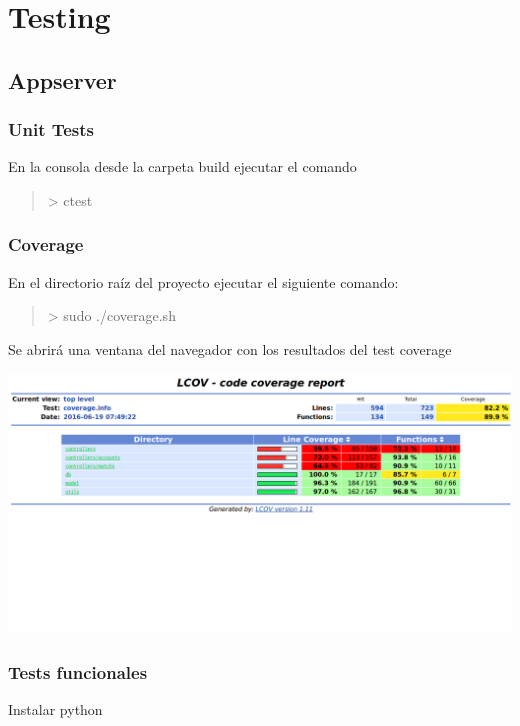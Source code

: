 \documentclass[letterpaper,10pt,english]{sphinxmanual}
\begin{document}
\section{Testing}
\label{manuals:testing}

\subsection{Appserver}
\label{manuals:id2}

\subsubsection{Unit Tests}
\label{manuals:unit-tests}
En la consola desde la carpeta build ejecutar el comando
\begin{quote}

\textgreater{} ctest
\end{quote}


\subsubsection{Coverage}
\label{manuals:coverage}
En el directorio raíz del proyecto ejecutar el siguiente comando:
\begin{quote}

\textgreater{} sudo ./coverage.sh
\end{quote}

Se abrirá una ventana del navegador con los resultados del test coverage

\includegraphics{coverage.png}


\subsubsection{Tests funcionales}
\label{manuals:tests-funcionales}
Instalar python
\end{document}
